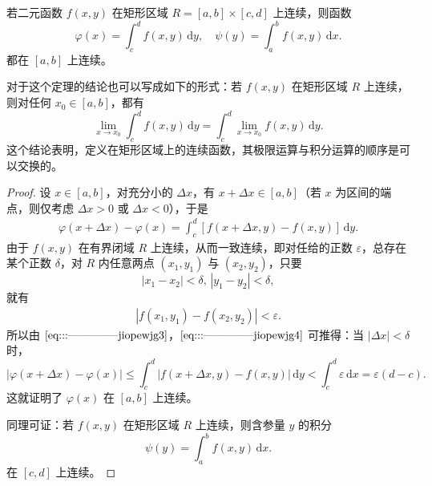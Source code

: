 \documentclass[../../main.tex]{subfiles}
\begin{document}
\begin{theorem}[连续性]\label{theorem:含参量积分的连续性}
若二元函数 \( f(x,y) \) 在矩形区域 \( R = [a,b] \times [c,d] \) 上连续，则函数
\[
\varphi(x) = \int_{c}^{d} f(x,y) \, \mathrm{d}y,\quad \psi(y) = \int_{a}^{b} f(x,y) \, \mathrm{d}x .
\]
都在 \( [a,b] \) 上连续。
\end{theorem}
\begin{remark}
对于这个定理的结论也可以写成如下的形式：若 \( f(x,y) \) 在矩形区域 \( R \) 上连续，则对任何 \( x_0 \in [a,b] \)，都有
\[
\lim_{x \to x_0} \int_{c}^{d} f(x,y) \, \mathrm{d}y = \int_{c}^{d} \lim_{x \to x_0} f(x,y) \, \mathrm{d}y.
\]
这个结论表明，定义在矩形区域上的连续函数，其极限运算与积分运算的顺序是可以交换的。
\end{remark}
\begin{proof}
设 \( x \in [a,b] \)，对充分小的 \( \Delta x \)，有 \( x + \Delta x \in [a,b] \)（若 \( x \) 为区间的端点，则仅考虑 \( \Delta x > 0 \) 或 \( \Delta x < 0 \)），于是
\begin{align}
\varphi(x + \Delta x) - \varphi(x) = \int_{c}^{d} [f(x + \Delta x,y) - f(x,y)] \, \mathrm{d}y. \label{eq:::--------------jiopewjg3}
\end{align}
由于 \( f(x,y) \) 在有界闭域 \( R \) 上连续，从而一致连续，即对任给的正数 \( \varepsilon \)，总存在某个正数 \( \delta \)，对 \( R \) 内任意两点 \( (x_1,y_1) \) 与 \( (x_2,y_2) \)，只要
\[
|x_1 - x_2| < \delta, \, |y_1 - y_2| < \delta,
\]
就有
\begin{align}
|f(x_1,y_1) - f(x_2,y_2)| < \varepsilon.\label{eq:::--------------jiopewjg4}
\end{align}
所以由 \(\eqref{eq:::--------------jiopewjg3}\)，\(\eqref{eq:::--------------jiopewjg4}\) 可推得：当 \( |\Delta x| < \delta \) 时，
\[
|\varphi(x + \Delta x) - \varphi(x)| \leqslant \int_{c}^{d} |f(x + \Delta x,y) - f(x,y)| \, \mathrm{d}y
< \int_{c}^{d} \varepsilon \, \mathrm{d}x = \varepsilon(d - c).
\]
这就证明了 \( \varphi(x) \) 在 \( [a,b] \) 上连续。

同理可证：若 \( f(x,y) \) 在矩形区域 \( R \) 上连续，则含参量 \( y \) 的积分
\[
\psi(y) = \int_{a}^{b} f(x,y) \, \mathrm{d}x .
\]
在 \( [c,d] \) 上连续。
\end{proof}
\end{document}
